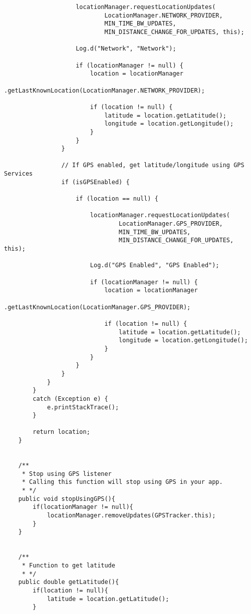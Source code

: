\begin{lstlisting}
                    locationManager.requestLocationUpdates(
                            LocationManager.NETWORK_PROVIDER,
                            MIN_TIME_BW_UPDATES,
                            MIN_DISTANCE_CHANGE_FOR_UPDATES, this);

                    Log.d("Network", "Network");

                    if (locationManager != null) {
                        location = locationManager
                                .getLastKnownLocation(LocationManager.NETWORK_PROVIDER);

                        if (location != null) {
                            latitude = location.getLatitude();
                            longitude = location.getLongitude();
                        }
                    }
                }

                // If GPS enabled, get latitude/longitude using GPS Services
                if (isGPSEnabled) {

                    if (location == null) {

                        locationManager.requestLocationUpdates(
                                LocationManager.GPS_PROVIDER,
                                MIN_TIME_BW_UPDATES,
                                MIN_DISTANCE_CHANGE_FOR_UPDATES, this);

                        Log.d("GPS Enabled", "GPS Enabled");

                        if (locationManager != null) {
                            location = locationManager
                                    .getLastKnownLocation(LocationManager.GPS_PROVIDER);

                            if (location != null) {
                                latitude = location.getLatitude();
                                longitude = location.getLongitude();
                            }
                        }
                    }
                }
            }
        }
        catch (Exception e) {
            e.printStackTrace();
        }

        return location;
    }


    /**
     * Stop using GPS listener
     * Calling this function will stop using GPS in your app.
     * */
    public void stopUsingGPS(){
        if(locationManager != null){
            locationManager.removeUpdates(GPSTracker.this);
        }
    }


    /**
     * Function to get latitude
     * */
    public double getLatitude(){
        if(location != null){
            latitude = location.getLatitude();
        }


\end{lstlisting}

